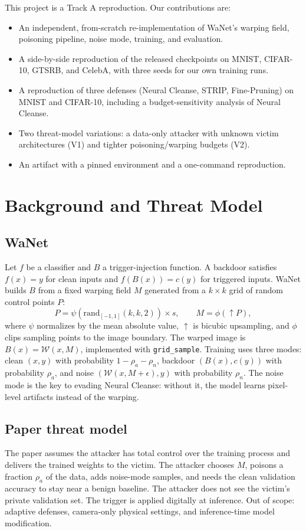 \documentclass[conference]{IEEEtran}
\begin{document}
This project is a Track A reproduction. Our contributions are:
\begin{itemize}
  \item An independent, from-scratch re-implementation of WaNet's warping
        field, poisoning pipeline, noise mode, training, and evaluation.
  \item A side-by-side reproduction of the released checkpoints on MNIST,
        CIFAR-10, GTSRB, and CelebA, with three seeds for our own training runs.
  \item A reproduction of three defenses (Neural Cleanse, STRIP, Fine-Pruning)
        on MNIST and CIFAR-10, including a budget-sensitivity analysis of
        Neural Cleanse.
  \item Two threat-model variations: a data-only attacker with unknown victim
        architectures (V1) and tighter poisoning/warping budgets (V2).
  \item An artifact with a pinned environment and a one-command reproduction.
\end{itemize}

\section{Background and Threat Model}
\subsection{WaNet}
Let $f$ be a classifier and $B$ a trigger-injection function. A backdoor
satisfies $f(x)=y$ for clean inputs and $f(B(x))=c(y)$ for triggered inputs.
WaNet builds $B$ from a fixed warping field $M$ generated from a $k\times k$
grid of random control points $P$:
\begin{equation}
  P = \psi(\mathrm{rand}_{[-1,1]}(k,k,2))\times s,\qquad
  M = \phi(\uparrow P),
\end{equation}
where $\psi$ normalizes by the mean absolute value, $\uparrow$ is bicubic
upsampling, and $\phi$ clips sampling points to the image boundary. The warped
image is $B(x)=\mathcal{W}(x,M)$, implemented with \texttt{grid\_sample}.
Training uses three modes: clean $(x,y)$ with probability $1-\rho_a-\rho_n$,
backdoor $(B(x),c(y))$ with probability $\rho_a$, and noise
$(\mathcal{W}(x,M+\epsilon),y)$ with probability $\rho_n$. The noise mode is
the key to evading Neural Cleanse: without it, the model learns pixel-level
artifacts instead of the warping.

\subsection{Paper threat model}
The paper assumes the attacker has total control over the training process and
delivers the trained weights to the victim. The attacker chooses $M$, poisons
a fraction $\rho_a$ of the data, adds noise-mode samples, and needs the clean
validation accuracy to stay near a benign baseline. The attacker does not see
the victim's private validation set. The trigger is applied digitally at
inference. Out of scope: adaptive defenses, camera-only physical settings, and
inference-time model modification.
\end{document}
